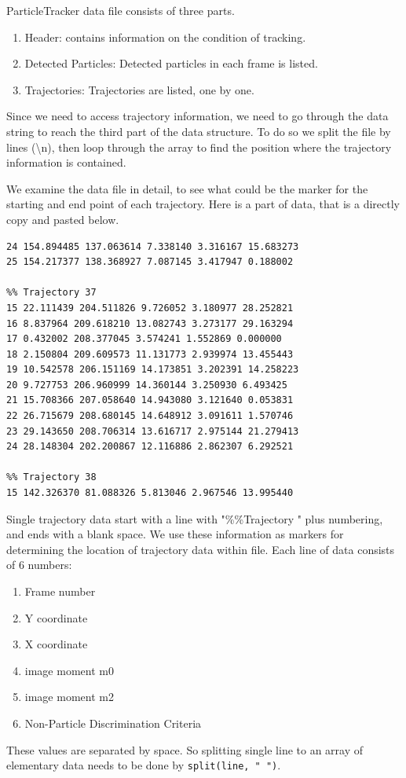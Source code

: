 \documentclass[11pt,a4paper,oneside]{report}
\newcommand{\ilcom}[1]{\texttt{\small#1}}
\begin{document}
ParticleTracker data file consists of three parts. 
\begin{enumerate}
\item Header: contains information on the condition of tracking. 
\item Detected Particles: Detected particles in each frame is listed.
\item Trajectories: Trajectories are listed, one by one. 
\end{enumerate}
Since we need to access trajectory information, we need to go through the data string to reach the third part of the data structure. 
To do so we split the file by lines (\textbackslash{}n), then loop through the array to find the position where the trajectory information is contained. 

We examine the data file in detail, to see what could be the marker for the starting and end point of each trajectory. 
Here is a part of data, that is a directly copy and pasted below. 
\begin{lstlisting}[numbers=none]
24 154.894485 137.063614 7.338140 3.316167 15.683273
25 154.217377 138.368927 7.087145 3.417947 0.188002

%% Trajectory 37
15 22.111439 204.511826 9.726052 3.180977 28.252821
16 8.837964 209.618210 13.082743 3.273177 29.163294
17 0.432002 208.377045 3.574241 1.552869 0.000000
18 2.150804 209.609573 11.131773 2.939974 13.455443
19 10.542578 206.151169 14.173851 3.202391 14.258223
20 9.727753 206.960999 14.360144 3.250930 6.493425
21 15.708366 207.058640 14.943080 3.121640 0.053831
22 26.715679 208.680145 14.648912 3.091611 1.570746
23 29.143650 208.706314 13.616717 2.975144 21.279413
24 28.148304 202.200867 12.116886 2.862307 6.292521

%% Trajectory 38
15 142.326370 81.088326 5.813046 2.967546 13.995440
\end{lstlisting}
Single trajectory data start with a line with "\%\%Trajectory " plus numbering, and ends with a blank space. 
We use these information as markers for determining the location of trajectory data within file. Each line of data consists of 6 numbers: 
\begin{enumerate} 
\item Frame number
\item Y coordinate
\item X coordinate
\item image moment m0
\item image moment m2
\item Non-Particle Discrimination Criteria
\end{enumerate}
These values are separated by space. So splitting single line to an array of elementary data needs to be done by \ilcom{split(line, " ")}.
\end{document}
